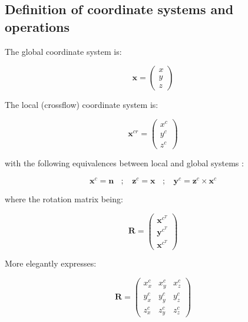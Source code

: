 \subsection{Definition of coordinate systems and operations}

The global coordinate system is:

\begin{equation}
\boldsymbol{x} =  \begin{pmatrix} x \\ y \\ z \end{pmatrix}
\end{equation}

The local (crossflow) coordinate system is:

\begin{equation}
\boldsymbol{x}^{cr} = \begin{pmatrix} x^c \\ y^c \\ z^c \end{pmatrix}
\end{equation}

with the following equivalences between local and global systems :

\begin{equation}
\boldsymbol{x}^c = \boldsymbol{n}  ~~~~ ; ~~~~ \boldsymbol{z}^c = \boldsymbol{x}  ~~~~ ; ~~~~ \boldsymbol{y}^c =  \boldsymbol{z}^c \times \boldsymbol{x}^c
\end{equation}

where the rotation matrix being:

\begin{equation}
\boldsymbol{R} = \begin{pmatrix} \boldsymbol{x}^{c^T} \\ \boldsymbol{y}^{c^T} \\ \boldsymbol{x}^{c^T} \end{pmatrix}
\end{equation}

More elegantly expresses:

\begin{equation}
\boldsymbol{R} = \begin{pmatrix} x^c_x & x^c_y & x^c_z \\ y^c_x & y^c_y & y^c_z \\ z^c_x & z^c_y & z^c_z \end{pmatrix}
\end{equation}



